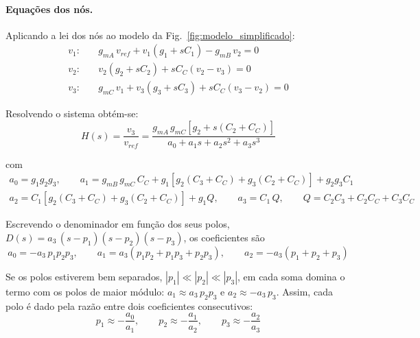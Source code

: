 \paragraph{Equações dos nós.}
Aplicando a lei dos nós ao modelo da Fig.~\ref{fig:modelo_simplificado}:
\begin{align}
    v_1:&\quad g_{mA}\,v_{ref} + v_1\left(g_1 + sC_1\right) - g_{mB}\,v_2 = 0 \\
    v_2:&\quad v_2\left(g_2 + sC_2\right) + sC_C\left(v_2 - v_3\right) = 0 \\
    v_3:&\quad g_{mC}\,v_1 + v_3\left(g_3 + sC_3\right) + sC_C\left(v_3 - v_2\right) = 0
\end{align}

Resolvendo o sistema obtém-se:
\begin{equation}
    H(s) = \frac{v_3}{v_{ref}} = \frac{g_{mA}\,g_{mC}\left[g_2 + s\left(C_2 + C_C\right)\right]}{a_0 + a_1 s + a_2 s^2 + a_3 s^3}
\end{equation}

com
\begin{equation}
\begin{gathered}
    a_0 = g_1 g_2 g_3, \qquad
    a_1 = g_{mB}\,g_{mC}\,C_C + g_1\left[g_2\left(C_3 + C_C\right) + g_3\left(C_2 + C_C\right)\right] + g_2 g_3 C_1 \\
    a_2 = C_1\left[g_2\left(C_3 + C_C\right) + g_3\left(C_2 + C_C\right)\right] + g_1 Q, \qquad
    a_3 = C_1\,Q, \qquad Q = C_2 C_3 + C_2 C_C + C_3 C_C
\end{gathered}
\end{equation}

Escrevendo o denominador em função dos seus polos, $D(s) = a_3\,(s - p_1)(s - p_2)(s - p_3)$, os coeficientes são
\begin{equation}
    a_0 = -a_3\,p_1 p_2 p_3, \qquad a_1 = a_3\left(p_1 p_2 + p_1 p_3 + p_2 p_3\right), \qquad a_2 = -a_3\left(p_1 + p_2 + p_3\right)
\end{equation}

Se os polos estiverem bem separados, $|p_1| \ll |p_2| \ll |p_3|$, em cada soma domina o termo com os polos de maior
módulo: $a_1 \approx a_3\,p_2 p_3$ e $a_2 \approx -a_3\,p_3$. Assim, cada polo é dado pela razão entre dois coeficientes
consecutivos:
\begin{equation}
    p_1 \approx -\frac{a_0}{a_1}, \qquad p_2 \approx -\frac{a_1}{a_2}, \qquad p_3 \approx -\frac{a_2}{a_3}
\end{equation}

